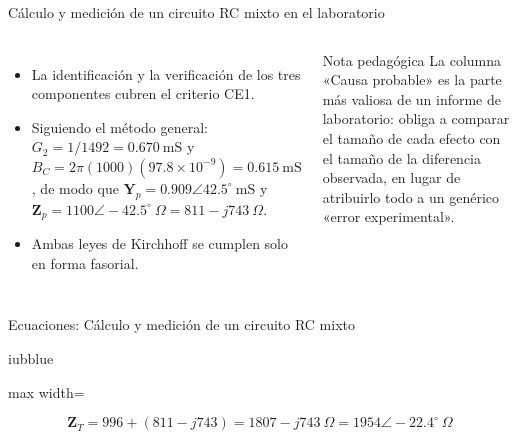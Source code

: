 \documentclass[aspectratio=169,11pt,xcolor={table}]{beamer}
\begin{document}
\begin{frame}{{\normalsize Cálculo y medición de un circuito RC mixto en el laboratorio}}
\begin{columns}[c,onlytextwidth]
\small
\begin{itemize}\setlength{\itemsep}{4pt}
  \item La identificación y la verificación de los tres componentes cubren el criterio CE1.
  \item Siguiendo el método general: $G_2 = 1/1492 = 0.670\ \text{mS}$ y $B_C = 2\pi(1000)(97.8 \times 10^{-9}) = 0.615\ \text{mS}$, de modo que $\mathbf{Y}_p = 0.909 \angle 42.5^\circ\ \text{mS}$ y $\mathbf{Z}_p = 1100 \angle -42.5^\circ\ \Omega = 811 - j743\ \Omega$.
  \item Ambas leyes de Kirchhoff se cumplen solo en forma fasorial.
\end{itemize}
\begin{cardO}{Nota pedagógica}
\footnotesize La columna «Causa probable» es la parte más valiosa de un informe de laboratorio: obliga a comparar el tamaño de cada efecto con el tamaño de la diferencia observada, en lugar de atribuirlo todo a un genérico «error experimental».
\end{cardO}
\end{columns}
\end{frame}

\begin{frame}{{\normalsize Ecuaciones: Cálculo y medición de un circuito RC mixto}}
\begin{cajaplana}{iubblue}
\centering
\begin{adjustbox}{max width=\linewidth}
\begin{minipage}{1.30\linewidth}
{\large
\begin{equation*}
  \mathbf{Z}_T = 996 + (811 - j743) = 1807 - j743\ \Omega = 1954 \angle -22.4^\circ\ \Omega
\end{equation*}
}
\end{minipage}
\end{adjustbox}
\end{cajaplana}
\end{frame}
\end{document}
